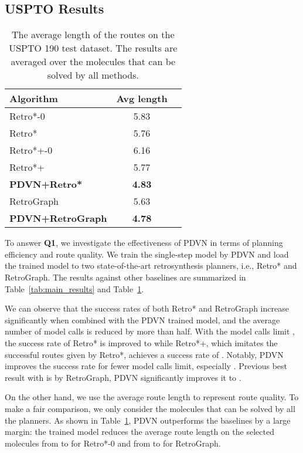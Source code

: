 \documentclass[nohyperref]{article}
\theoremstyle{plain}
\theoremstyle{definition}
\theoremstyle{remark}
\begin{document}
\subsection{USPTO Results}

\begin{table}[t]
    \caption{The average length of the routes on the USPTO 190 test dataset. The results are averaged over the  molecules that can be solved by all methods.}
    \label{tab:quality_metrics}
    \centering
    \begin{tabular}{l c c}
        \toprule
Algorithm & Avg length  \\
\midrule
        Retro*-0 & 5.83 \\ 
Retro* & 5.76 \\
Retro*+-0 & 6.16 \\
Retro*+ & 5.77 \\
\textbf{PDVN+Retro*} & \textbf{4.83} \\
\midrule
        RetroGraph & 5.63 \\
\textbf{PDVN+RetroGraph} & \textbf{4.78}\\ 
\bottomrule
    \end{tabular}
\end{table}

To answer \textbf{Q1}, we investigate the effectiveness of PDVN in terms of planning efficiency and route quality. We train the single-step model by PDVN and load the trained model to two state-of-the-art retrosynthesis planners, i.e., Retro* and RetroGraph. The results against other baselines are summarized in Table~\ref{tab:main_results} and Table~\ref{tab:quality_metrics}.

We can observe that the success rates of both Retro* and RetroGraph increase significantly when combined with the PDVN trained model, and the average number of model calls is reduced by more than half. With the model calls limit , the success rate of Retro* is improved to  while Retro*+, which imitates the successful routes given by Retro*, achieves a success rate of . Notably, PDVN improves the success rate for fewer model calls limit, especially . 
Previous best result with  is  by RetroGraph, PDVN significantly improves it to .


On the other hand, we use the average route length to represent route quality.
To make a fair comparison, we only consider the molecules that can be solved by all the planners. As shown in  Table~\ref{tab:quality_metrics}, PDVN outperforms the baselines by a large margin: the trained model reduces the average route length on the  selected molecules from  to  for Retro*-0 and from  to  for RetroGraph.
\end{document}
